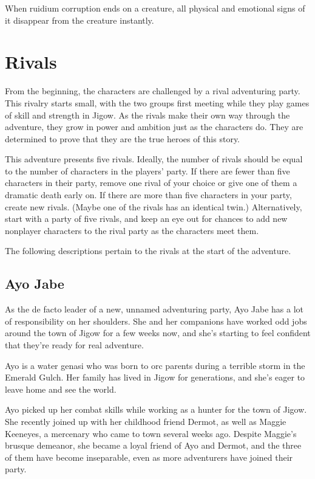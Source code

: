 \documentclass[letterpaper, 11pt, bg=full, twocolumn]{dndbook}
\begin{document}
When ruidium corruption ends on a creature, all physical and emotional signs of it disappear from the creature instantly.
\section{Rivals}

From the beginning, the characters are challenged by a rival adventuring party. This rivalry starts small, with the two groups first meeting while they play games of skill and strength in Jigow. As the rivals make their own way through the adventure, they grow in power and ambition just as the characters do. They are determined to prove that they are the true heroes of this story.

This adventure presents five rivals. Ideally, the number of rivals should be equal to the number of characters in the players' party. If there are fewer than five characters in their party, remove one rival of your choice or give one of them a dramatic death early on. If there are more than five characters in your party, create new rivals. (Maybe one of the rivals has an identical twin.) Alternatively, start with a party of five rivals, and keep an eye out for chances to add new nonplayer characters to the rival party as the characters meet them.

The following descriptions pertain to the rivals at the start of the adventure.

\subsection{Ayo Jabe}


As the de facto leader of a new, unnamed adventuring party, Ayo Jabe has a lot of responsibility on her shoulders. She and her companions have worked odd jobs around the town of Jigow for a few weeks now, and she's starting to feel confident that they're ready for real adventure.

Ayo is a water genasi who was born to orc parents during a terrible storm in the Emerald Gulch. Her family has lived in Jigow for generations, and she's eager to leave home and see the world.

Ayo picked up her combat skills while working as a hunter for the town of Jigow. She recently joined up with her childhood friend Dermot, as well as Maggie Keeneyes, a mercenary who came to town several weeks ago. Despite Maggie's brusque demeanor, she became a loyal friend of Ayo and Dermot, and the three of them have become inseparable, even as more adventurers have joined their party.
\end{document}
